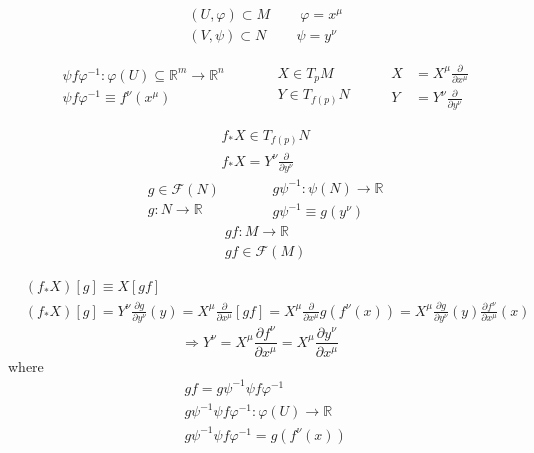 \documentclass[twoside]{amsart}
\begin{document}
\[
\begin{aligned}
  & (U , \varphi) \subset M \quad \quad \, \varphi = x^{\mu} \\ 
  & (V, \psi ) \subset N \quad \quad \, \psi = y^{\nu} \end{aligned}
\]

\[
\begin{aligned}
  & \psi f \varphi^{-1} : \varphi(U) \subseteq \mathbb{R}^m \to \mathbb{R}^n \\ 
  & \psi f\varphi^{-1} \equiv f^{\nu}(x^{\mu })
\end{aligned} \quad \quad \, \begin{aligned} 
  & X \in T_p M \\
  & Y \in T_{f(p)} N \end{aligned} \quad \quad \, \begin{aligned} 
  X & = X^{\mu} \frac{ \partial }{ \partial x^{\mu } } \\
  Y & = Y^{\nu} \frac{ \partial }{ \partial y^{\nu } } \end{aligned}
\]

\[
\begin{aligned}
  & f_* X \in T_{f(p)} N \\ 
  & f_* X   = Y^{\nu} \frac{ \partial }{ \partial y^{\nu }}
\end{aligned}
\]
\[
\begin{aligned}
  & g \in \mathcal{F}(N) \\ 
  & g: N \to \mathbb{R}
\end{aligned} \quad \quad \, 
\begin{aligned}
  & g\psi^{-1}: \psi(N) \to \mathbb{R} \\ 
  & g\psi^{-1} \equiv g(y^{\nu} )
\end{aligned} 
\]
\[
\begin{aligned}
  & gf : M \to \mathbb{R} \\ 
  & gf \in \mathcal{F}(M)
\end{aligned}
\]

\[
\begin{aligned}
  & (f_* X)[g] \equiv X[gf] \\ 
  & (f_* X)[g] = Y^{\nu} \frac{ \partial g}{ \partial y^{\nu }}(y) = X^{\mu} \frac{ \partial }{ \partial x^{\mu }}[gf]  = X^{\mu} \frac{ \partial }{ \partial x^{\mu } } g( f^{\nu}(x) ) = X^{\mu} \frac{ \partial g}{ \partial y^{\nu} }(y) \frac{ \partial f^{\nu} }{ \partial x^{\mu} }(x)
\end{aligned}
\]
\[
\Longrightarrow \boxed{ Y^{\nu} = X^{\mu } \frac{ \partial f^{\nu }}{ \partial x^{\mu }}  = X^{\mu} \frac{ \partial y^{\nu} }{ \partial x^{\mu }} }
\]
where
\[
\begin{aligned}
  & gf = g \psi^{-1} \psi f \varphi^{-1} \\ 
  & g\psi^{-1} \psi f \varphi^{-1} : \varphi(U) \to \mathbb{R} \\ 
  & g\psi^{-1} \psi f \varphi^{-1} = g(f^{\nu}(x) ) 
\end{aligned}
\]
\end{document}
